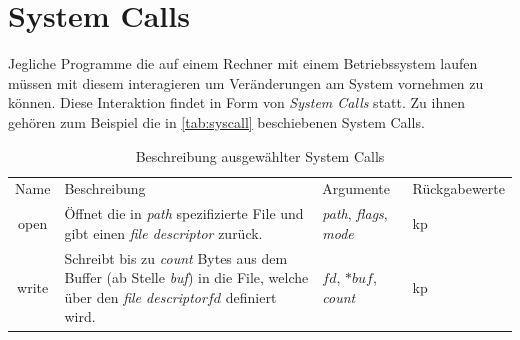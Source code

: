 

    \section{System Calls}
    \label{sec:syscalls}
        Jegliche Programme die auf einem Rechner mit einem Betriebssystem laufen müssen mit diesem interagieren um Veränderungen am System vornehmen zu können.
        Diese Interaktion findet in Form von \textit{System Calls}  statt.
        Zu ihnen gehören zum Beispiel die in \autoref{tab:syscall} beschiebenen System Calls.

        \begin{table}[H]
            \small
            \label{tab:syscall}
            \centering
            \begin{tabular}{c||p{6cm}|p{3cm}|p{3cm}}
                \hline
                \rowcolor{Gray!36}
                \multicolumn{4}{c}{System Calls}\\
                \hline
                Name & Beschreibung & Argumente & Rückgabewerte\\
                \hline
                \hline
                \rowcolor{Gray!16}
                open& Öffnet die in \textit{path} spezifizierte File und gibt einen \textit{file descriptor} zurück.& \textit{path}, \textit{flags}, \textit{mode} & kp\\
                write& Schreibt bis zu \textit{count} Bytes aus dem Buffer (ab Stelle \textit{buf}) in die File, welche über den \textit{file descriptor}$fd$ definiert wird. & $fd$, $*buf$, \textit{count} & kp\\
                \hline
            \end{tabular}
            \caption{Beschreibung ausgewählter System Calls}
        \end{table}

